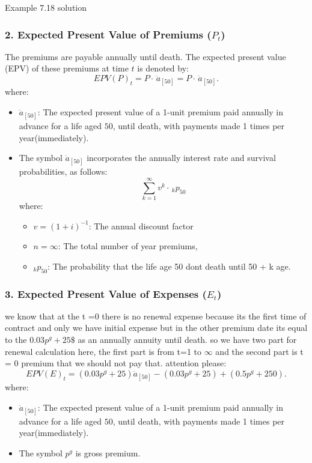 \begin{solve}{}{Example 7.18 solution}
		\subsubsection*{2. Expected Present Value of Premiums (\(P_t\))}
		
		The premiums are payable annually until death. The expected present value (EPV) of these premiums at time \(t\) is denoted by:
		\[
		EPV(P)_t = P \cdot \, \ddot{a}_{[50]} = P \cdot \, \ddot{a}_{[50]}.
		\]
		where:
		\begin{itemize}
			\item \(\ddot{a}_{[50]}\): The expected present value of a 1-unit premium paid annually in advance for a life aged \(50\), until death, with payments made 1 times per year(immediately).
			\item The symbol \(\ddot{a}_{[50]}\) incorporates the annually interest rate and survival probabilities, as follows:
			\[
			\sum_{k=1}^{\infty} v^{k} \cdot \,_kp_{50}
			\]
			where:
			\begin{itemize}
				\item \(v = (1+i)^{-1}\): The annual discount factor %
				\item \(n = \infty \): The total number of year premiums,
				\item \(_kp_{50}\): The probability that the life age 50 dont death until 50 + k age.
			\end{itemize}
		\end{itemize}
		
		\subsubsection*{3. Expected Present Value of Expenses (\(E_t\))}
		
		we know that at the t =0 there is no renewal expense because its the first time of contract and only we have initial expense but in the other premium date its equal to the $0.03 p^g + 25\$$ as an annually annuity until death. so we have two part for renewal calculation here, the first part is from t=1 to $\infty$ and the second part is t = 0 premium that we should not pay that. attention please:
		\[
		EPV(E)_t = (0.03 p^g + 25) \ddot{a}_{[50]} - (0.03 p^g + 25) + (0.5 p^g + 250) .
		\]
		where:
		\begin{itemize}
				\item \(\ddot{a}_{[50]}\): The expected present value of a 1-unit premium paid annually in advance for a life aged \(50\), until death, with payments made 1 times per year(immediately).
			\item The symbol \(p^g\) is gross premium.
		\end{itemize}
		

\end{solve}
